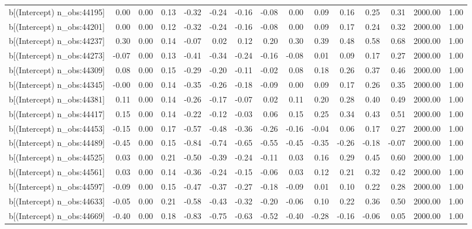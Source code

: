 \begin{table}[ht]
\begin{tabular}{rrrrrrrrrrrrrrr}
  b[(Intercept) n\_obs:44195] & 0.00 & 0.00 & 0.13 & -0.32 & -0.24 & -0.16 & -0.08 & 0.00 & 0.09 & 0.16 & 0.25 & 0.31 & 2000.00 & 1.00 \\ 
  b[(Intercept) n\_obs:44201] & 0.00 & 0.00 & 0.12 & -0.32 & -0.24 & -0.16 & -0.08 & 0.00 & 0.09 & 0.17 & 0.24 & 0.32 & 2000.00 & 1.00 \\ 
  b[(Intercept) n\_obs:44237] & 0.30 & 0.00 & 0.14 & -0.07 & 0.02 & 0.12 & 0.20 & 0.30 & 0.39 & 0.48 & 0.58 & 0.68 & 2000.00 & 1.00 \\ 
  b[(Intercept) n\_obs:44273] & -0.07 & 0.00 & 0.13 & -0.41 & -0.34 & -0.24 & -0.16 & -0.08 & 0.01 & 0.09 & 0.17 & 0.27 & 2000.00 & 1.00 \\ 
  b[(Intercept) n\_obs:44309] & 0.08 & 0.00 & 0.15 & -0.29 & -0.20 & -0.11 & -0.02 & 0.08 & 0.18 & 0.26 & 0.37 & 0.46 & 2000.00 & 1.00 \\ 
  b[(Intercept) n\_obs:44345] & -0.00 & 0.00 & 0.14 & -0.35 & -0.26 & -0.18 & -0.09 & 0.00 & 0.09 & 0.17 & 0.26 & 0.35 & 2000.00 & 1.00 \\ 
  b[(Intercept) n\_obs:44381] & 0.11 & 0.00 & 0.14 & -0.26 & -0.17 & -0.07 & 0.02 & 0.11 & 0.20 & 0.28 & 0.40 & 0.49 & 2000.00 & 1.00 \\ 
  b[(Intercept) n\_obs:44417] & 0.15 & 0.00 & 0.14 & -0.22 & -0.12 & -0.03 & 0.06 & 0.15 & 0.25 & 0.34 & 0.43 & 0.51 & 2000.00 & 1.00 \\ 
  b[(Intercept) n\_obs:44453] & -0.15 & 0.00 & 0.17 & -0.57 & -0.48 & -0.36 & -0.26 & -0.16 & -0.04 & 0.06 & 0.17 & 0.27 & 2000.00 & 1.00 \\ 
  b[(Intercept) n\_obs:44489] & -0.45 & 0.00 & 0.15 & -0.84 & -0.74 & -0.65 & -0.55 & -0.45 & -0.35 & -0.26 & -0.18 & -0.07 & 2000.00 & 1.00 \\ 
  b[(Intercept) n\_obs:44525] & 0.03 & 0.00 & 0.21 & -0.50 & -0.39 & -0.24 & -0.11 & 0.03 & 0.16 & 0.29 & 0.45 & 0.60 & 2000.00 & 1.00 \\ 
  b[(Intercept) n\_obs:44561] & 0.03 & 0.00 & 0.14 & -0.36 & -0.24 & -0.15 & -0.06 & 0.03 & 0.12 & 0.21 & 0.32 & 0.42 & 2000.00 & 1.00 \\ 
  b[(Intercept) n\_obs:44597] & -0.09 & 0.00 & 0.15 & -0.47 & -0.37 & -0.27 & -0.18 & -0.09 & 0.01 & 0.10 & 0.22 & 0.28 & 2000.00 & 1.00 \\ 
  b[(Intercept) n\_obs:44633] & -0.05 & 0.00 & 0.21 & -0.58 & -0.43 & -0.32 & -0.20 & -0.06 & 0.10 & 0.22 & 0.36 & 0.50 & 2000.00 & 1.00 \\ 
  b[(Intercept) n\_obs:44669] & -0.40 & 0.00 & 0.18 & -0.83 & -0.75 & -0.63 & -0.52 & -0.40 & -0.28 & -0.16 & -0.06 & 0.05 & 2000.00 & 1.00 \\ 

\end{tabular}
\end{table}

